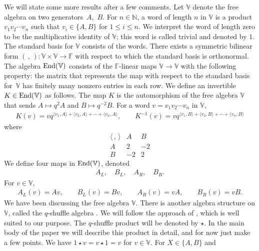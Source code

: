 \documentclass[pdftex]{sigma}
\numberwithin{equation}{section}
\begin{document}
We will state some more results after a few comments.
Let $\mathbb V$ denote the free algebra on two generators~$A$,~$B$.
For $n \in \mathbb N$, a word of length $n$ in $\mathbb V$
is a product $v_1 v_2 \cdots v_n$
such that $v_i \in \lbrace A, B\rbrace$
for $1 \leq i \leq n$. We interpret the word of length zero
 to be the multiplicative
identity of $\mathbb V$; this word is called trivial and denoted by $1$.
The standard basis for $\mathbb V$ consists of the words.
There exists a symmetric bilinear form
$(\, ,\,)\colon \mathbb V\times \mathbb V \to
\mathbb F$ with respect to which the standard basis is
orthonormal. The algebra ${\rm End}(\mathbb V)$ consists of the
$\mathbb F$-linear maps $\mathbb V\to \mathbb V$ with
the following property: the matrix that represents the map
with respect to the standard basis for~$\mathbb V$ has
 finitely many nonzero entries in each row.
We define an invertible $K
\in {\rm End}(\mathbb V)$ as follows.
The map $K$ is the automorphism of
the free algebra $\mathbb V$ that sends $A\mapsto q^2 A$ and
$B\mapsto q^{-2}B$. For a word $v=v_1v_2\cdots v_n$ in $\mathbb V$,
\begin{gather*}
K(v) = v
q^{\langle v_1, A\rangle+
\langle v_2, A\rangle+ \cdots+
\langle v_n, A\rangle
},
 \qquad
K^{-1}(v) = v
q^{\langle v_1, B\rangle+
\langle v_2, B\rangle+ \cdots+
\langle v_n, B\rangle
}
\end{gather*}
where
\[
\begin{array}{c|cc}
 \langle\,,\,\rangle & A & B
 \\ \hline
 A & 2 & -2 \\
B & -2 & 2
 \end{array}
\]
We define four maps in ${\rm End}(\mathbb V)$, denoted
\begin{gather}
A_L, \quad
B_L, \quad
A_R, \quad
B_R.\label{eq:ABLRIntro}
\end{gather}
For $v \in \mathbb V$,
\begin{gather*}
A_L(v) = Av, \qquad
B_L(v) = Bv, \qquad
A_R(v) = vA, \qquad
B_R(v) = vB.
\end{gather*}
We have been discussing the free algebra $\mathbb V$. There is
another algebra structure on $\mathbb V$, called the $q$-shuffle algebra
\cite{green,rosso1, rosso}. We will follow the approach of \cite{green}, which is
well suited to our purpose.
The $q$-shuffle product will be denoted by
$\star$.
 In the main body of the paper
we will describe this product in detail, and for now just make a few points.
We have $1 \star v = v \star 1 = v$ for $v \in \mathbb V$.
 For $X \in \lbrace A, B\rbrace$ and
\end{document}
